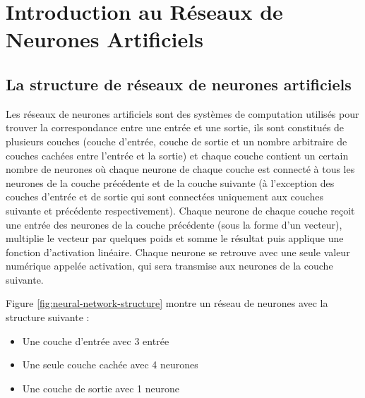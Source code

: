\chapter{Introduction au Réseaux de Neurones Artificiels}

\section{La structure de réseaux de neurones artificiels}
Les réseaux de neurones artificiels sont des systèmes de computation utilisés pour trouver la correspondance entre une entrée et une sortie, ils sont constitués de plusieurs couches (couche d'entrée, couche de sortie et un nombre arbitraire de couches cachées entre l'entrée et la sortie) et chaque couche contient un certain nombre de neurones où chaque neurone de chaque couche est connecté à tous les neurones de la couche précédente et de la couche suivante (à l'exception des couches d'entrée et de sortie qui sont connectées uniquement aux couches suivante et précédente respectivement).
Chaque neurone de chaque couche reçoit une entrée des neurones de la couche précédente (sous la forme d'un vecteur), multiplie le vecteur par quelques poids et somme le résultat puis applique une fonction d'activation linéaire. Chaque neurone se retrouve avec une seule valeur numérique appelée activation, qui sera transmise aux neurones de la couche suivante.

Figure \ref{fig:neural-network-structure} montre un réseau de neurones avec la structure suivante :

\begin{itemize}
    \item Une couche d'entrée avec 3 entrée
    \item Une seule couche cachée avec 4 neurones
    \item Une couche de sortie avec 1 neurone 
\end{itemize}

